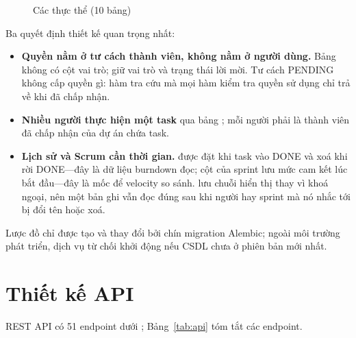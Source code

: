 \documentclass[../main.tex]{subfiles}
\begin{document}
\begin{figure}[H]
\caption{Các thực thể (10 bảng)}\label{fig:er}
\end{figure}

Ba quyết định thiết kế quan trọng nhất:
\begin{itemize}
  \item \textbf{Quyền nằm ở tư cách thành viên, không nằm ở người dùng.} Bảng  không có
        cột vai trò;  giữ vai trò và trạng thái lời mời. Tư cách PENDING
        không cấp quyền gì: hàm tra cứu mà mọi hàm kiểm tra quyền sử dụng chỉ trả về khi đã chấp nhận.
  \item \textbf{Nhiều người thực hiện một task} qua bảng ; mỗi người phải là
        thành viên đã chấp nhận của dự án chứa task.
  \item \textbf{Lịch sử và Scrum cần thời gian.}  được đặt khi task vào DONE
        và xoá khi rời DONE---đây là dữ liệu burndown đọc; cột  của sprint
        lưu mức cam kết lúc bắt đầu---đây là mốc để velocity so sánh.  lưu chuỗi
        hiển thị thay vì khoá ngoại, nên một bản ghi vẫn đọc đúng sau khi người hay sprint mà nó nhắc
        tới bị đổi tên hoặc xoá.
\end{itemize}
Lược đồ chỉ được tạo và thay đổi bởi chín migration Alembic; ngoài môi trường phát triển, dịch vụ từ
chối khởi động nếu CSDL chưa ở phiên bản mới nhất.

\section{Thiết kế API}
REST API có 51 endpoint dưới ; Bảng~\ref{tab:api} tóm tắt các endpoint.
\end{document}
